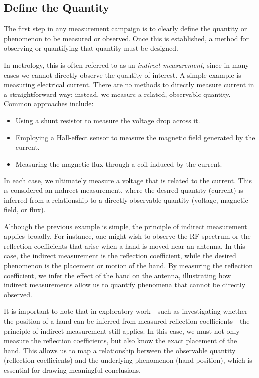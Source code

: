 \subsection{Define the Quantity}

The first step in any measurement campaign is to clearly define the quantity or phenomenon to be measured or observed. Once this is established, a method for observing or quantifying that quantity must be designed.

In metrology, this is often referred to as an \emph{indirect measurement}, since in many cases we cannot directly observe the quantity of interest. A simple example is measuring electrical current. There are no methods to directly measure current in a straightforward way; instead, we measure a related, observable quantity. Common approaches include:

\begin{itemize}
\item Using a shunt resistor to measure the voltage drop across it.
\item Employing a Hall-effect sensor to measure the magnetic field generated by the current.
\item Measuring the magnetic flux through a coil induced by the current.
\end{itemize}

In each case, we ultimately measure a voltage that is related to the current. This is considered an indirect measurement, where the desired quantity (current) is inferred from a relationship to a directly observable quantity (voltage, magnetic field, or flux).

Although the previous example is simple, the principle of indirect measurement applies broadly. For instance, one might wish to observe the RF spectrum or the reflection coefficients that arise when a hand is moved near an antenna. In this case, the indirect measurement is the reflection coefficient, while the desired phenomenon is the placement or motion of the hand. By measuring the reflection coefficient, we infer the effect of the hand on the antenna, illustrating how indirect measurements allow us to quantify phenomena that cannot be directly observed.

It is important to note that in exploratory work - such as investigating whether the position of a hand can be inferred from measured reflection coefficients - the principle of indirect measurement still applies. In this case, we must not only measure the reflection coefficients, but also know the exact placement of the hand. This allows us to map a relationship between the observable quantity (reflection coefficients) and the underlying phenomenon (hand position), which is essential for drawing meaningful conclusions.

